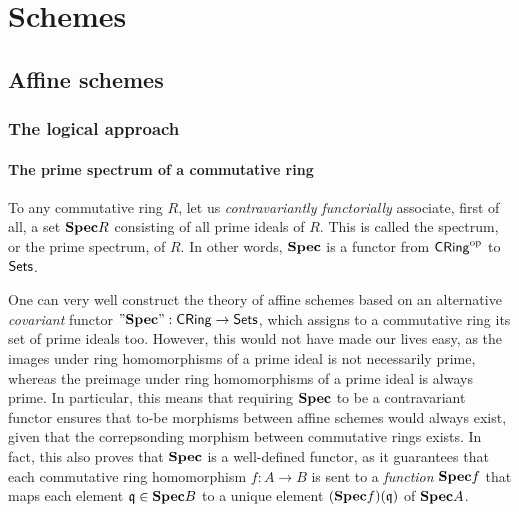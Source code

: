 \chapter{Schemes}
    \begin{abstract}
        
    \end{abstract}
    
    \minitoc

    \section{Affine schemes}
        \subsection{The logical approach}
            \subsubsection{The prime spectrum of a commutative ring} \index{$\Spec$}
                \begin{definition}
                    To any commutative ring $R$, let us \textit{contravariantly functorially} associate, first of all, a set $\mathbf{Spec} R$ consisting of all prime ideals of $R$. This is called the spectrum, or the prime spectrum, of $R$. In other words, $\Spec$ is a functor from $\mathsf{CRing}^{\mathrm{op}}$ to $\mathsf{Sets}$.
                \end{definition}
                \begin{remark}
                    One can very well construct the theory of affine schemes based on an alternative \textit{covariant} functor $"\mathbf{Spec}": \mathsf{CRing} \to \mathsf{Sets}$, which assigns to a commutative ring its set of prime ideals too. However, this would not have made our lives easy, as the images under ring homomorphisms of a prime ideal is not necessarily prime, whereas the preimage under ring homomorphisms of a prime ideal is always prime. In particular, this means that requiring $\Spec$ to be a contravariant functor ensures that to-be morphisms between affine schemes would always exist, given that the correpsonding morphism between commutative rings exists. In fact, this also proves that $\Spec$ is a well-defined functor, as it guarantees that each commutative ring homomorphism $f: A \to B$ is sent to a \textit{function} $\mathbf{Spec} f$ that maps each element $\mathfrak{q} \in \mathbf{Spec} B$ to a unique element $(\mathbf{Spec} f)(\mathfrak{q})$ of $\mathbf{Spec} A$.
                \end{remark}
